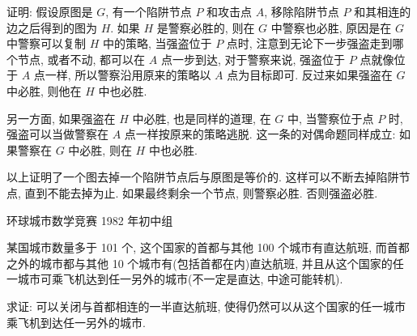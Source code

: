 证明: 假设原图是 $ G $, 有一个陷阱节点 $ P $ 和攻击点 $ A $, 移除陷阱节点 $ P $ 和其相连的边之后得到的图为 $ H $. 如果 $ H $ 是警察必胜的, 则在 $ G $ 中警察也必胜, 原因是在 $ G $ 中警察可以复制 $ H $ 中的策略, 当强盗位于 $ P $ 点时, 注意到无论下一步强盗走到哪个节点, 或者不动, 都可以在 $ A $ 点一步到达, 对于警察来说, 强盗位于 $ P $ 点就像位于 $ A $ 点一样, 所以警察沿用原来的策略以 $ A $ 点为目标即可. 反过来如果强盗在 $ G $ 中必胜, 则他在 $ H $ 中也必胜. 

另一方面, 如果强盗在 $ H $ 中必胜, 也是同样的道理, 在 $ G $ 中, 当警察位于点 $ P $ 时, 强盗可以当做警察在
$ A $ 点一样按原来的策略逃脱. 这一条的对偶命题同样成立: 如果警察在 $ G $ 中必胜, 则在 $ H $ 中也必胜.

以上证明了一个图去掉一个陷阱节点后与原图是等价的. 这样可以不断去掉陷阱节点, 直到不能去掉为止. 如果最终剩余一个节点, 则警察必胜. 否则强盗必胜.

\newpage
\noindent 环球城市数学竞赛 1982 年初中组

某国城市数量多于 101 个, 这个国家的首都与其他 100 个城市有直达航班, 而首都之外的城市都与其他 10 个城市有(包括首都在内)直达航班, 并且从这个国家的任一城市可乘飞机达到任一另外的城市(不一定是直达, 中途可能转机). 

求证: 可以关闭与首都相连的一半直达航班, 使得仍然可以从这个国家的任一城市乘飞机到达任一另外的城市.

~

